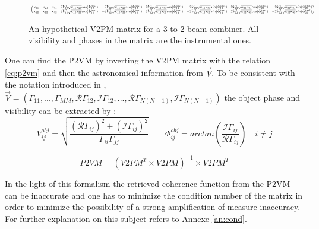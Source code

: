 \begin{figure}[h]
\begin{equation*}
\resizebox{\textwidth}{!}{
 $ \begin{pmatrix}
  \kappa_{11} & \kappa_{21} & \kappa_{31} &
  2V_{12}^{1}\sqrt{\kappa_{11}\kappa_{21}}cos(\Phi_{12}^{inst}) &
  -2V_{12}^{1}\sqrt{\kappa_{11}\kappa_{21}}sin(\Phi_{12}^{inst}) &
  2V_{13}^{1}\sqrt{\kappa_{11}\kappa_{31}}cos(\Phi_{13}^{inst}) &
 - 2V_{13}^{1}\sqrt{\kappa_{11}\kappa_{31}}sin(\Phi_{13}^{inst}) &
  2V_{23}^{1}\sqrt{\kappa_{21}\kappa_{31}}cos(\Phi_{23}^{inst}) & -2V_{23}^{1}\sqrt{\kappa_{21}\kappa_{31}}sin(\Phi_{23}^{inst})\\
  \kappa_{12} & \kappa_{22} & \kappa_{32} &
  2V_{12}^{2}\sqrt{\kappa_{12}\kappa_{22}}cos(\Phi_{12}^{inst}) &
  -2V_{12}^{2}\sqrt{\kappa_{12}\kappa_{22}}sin(\Phi_{12}^{inst}) &
  2V_{13}^{2}\sqrt{\kappa_{12}\kappa_{32}}cos(\Phi_{13}^{inst}) &
 - 2V_{13}^{2}\sqrt{\kappa_{12}\kappa_{32}}sin(\Phi_{13}^{inst}) &
  2V_{23}^{2}\sqrt{\kappa_{22}\kappa_{32}}cos(\Phi_{23}^{inst}) &   -2V_{23}^{2}\sqrt{\kappa_{22}\kappa_{32}}sin(\Phi_{23}^{inst})

\end{pmatrix}
$}
\end{equation*}
\caption{An hypothetical V2PM matrix for a 3 to 2 beam combiner. All visibility and phases in the matrix are the instrumental ones.}
\label{v2pm.expl}
\end{figure}

One can find the \gls{P2VM} by inverting the V2PM
matrix with the relation \ref{eq:p2vm} and then the astronomical
information from $\vec{V}$. To be consistent with the notation introduced in \cite{saviauk},   $\vec{V} =
(\Gamma_{11},...,\Gamma_{MM},\mathcal{R}\Gamma_{12},\mathcal{I}\Gamma_{12},...,\mathcal{R}\Gamma_{N(N-1)},\mathcal{I}\Gamma_{N(N-1)})$ the object phase and visibility can be extracted by :
$$
V_{ij}^{obj} = \sqrt{\frac{(\mathcal{R}\Gamma_{ij})^2+(\mathcal{I}\Gamma_{ij})^2}{\Gamma_{ii}\Gamma_{jj}}} \qquad
\Phi_{ij}^{obj} = arctan(\frac{\mathcal{I}\Gamma_{ij}}{\mathcal{R}\Gamma_{ij}}) \quad i\neq j
$$

\begin{equation}
  P2VM = (V2PM^T\times V2PM)^{-1}\times V2PM^{T} \label{eq:p2vm}
\end{equation}  

In the light of this formalism the retrieved coherence function from the \gls{P2VM} can be inaccurate and one has to minimize the condition number of the matrix in order to minimize the possibility of a strong amplification of measure inaccuracy. For further explanation on this subject refers to Annexe \ref{an:cond}.

